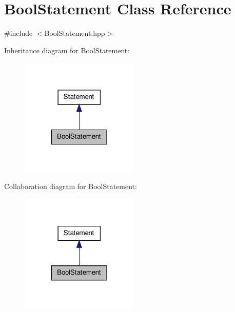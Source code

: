 \hypertarget{class_bool_statement}{\section{Bool\-Statement Class Reference}
\label{class_bool_statement}
}


{\ttfamily \#include $<$Bool\-Statement.\-hpp$>$}



Inheritance diagram for Bool\-Statement\-:
\nopagebreak
\begin{figure}[H]
\begin{center}
\leavevmode
\includegraphics[width=160pt]{class_bool_statement__inherit__graph}
\end{center}
\end{figure}


Collaboration diagram for Bool\-Statement\-:
\nopagebreak
\begin{figure}[H]
\begin{center}
\leavevmode
\includegraphics[width=160pt]{class_bool_statement__coll__graph}
\end{center}
\end{figure}

